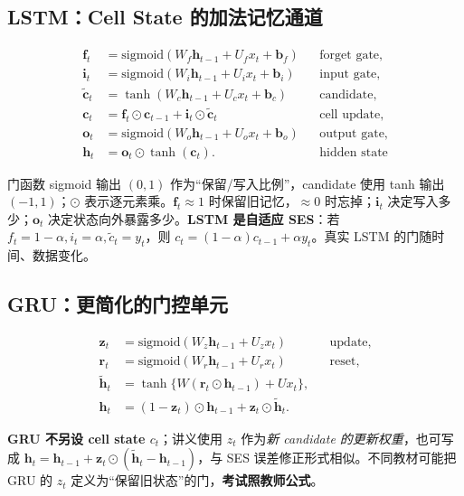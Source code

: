 \documentclass[UTF8,fontset=fandol,10.5pt,a4paper]{ctexart}
\begin{document}
\subsection{LSTM：Cell State 的加法记忆通道}
\begin{keybox}
\begin{align*}
\mathbf f_t&=\mathrm{sigmoid}(W_f\mathbf h_{t-1}+U_fx_t+\mathbf b_f) &&\text{forget gate},\\
\mathbf i_t&=\mathrm{sigmoid}(W_i\mathbf h_{t-1}+U_ix_t+\mathbf b_i) &&\text{input gate},\\
\tilde{\mathbf c}_t&=\tanh(W_c\mathbf h_{t-1}+U_cx_t+\mathbf b_c) &&\text{candidate},\\
\mathbf c_t&=\mathbf f_t\odot\mathbf c_{t-1}+\mathbf i_t\odot\tilde{\mathbf c}_t &&\text{cell update},\\
\mathbf o_t&=\mathrm{sigmoid}(W_o\mathbf h_{t-1}+U_ox_t+\mathbf b_o) &&\text{output gate},\\
\mathbf h_t&=\mathbf o_t\odot\tanh(\mathbf c_t). &&\text{hidden state}
\end{align*}
\end{keybox}
\par\smallskip{}\par\smallskip
门函数 sigmoid 输出 $(0,1)$ 作为“保留/写入比例”，candidate 使用 tanh 输出 $(-1,1)$；$\odot$ 表示逐元素乘。$\mathbf f_t\approx1$ 时保留旧记忆，$\approx0$ 时忘掉；$\mathbf i_t$ 决定写入多少；$\mathbf o_t$ 决定状态向外暴露多少。\textbf{LSTM 是自适应 SES}：若 $f_t=1-\alpha,i_t=\alpha,\tilde c_t=y_t$，则 $c_t=(1-\alpha)c_{t-1}+\alpha y_t$。真实 LSTM 的门随时间、数据变化。
\subsection{GRU：更简化的门控单元}
\begin{keybox}
\begin{align*}
\mathbf z_t&=\mathrm{sigmoid}(W_z\mathbf h_{t-1}+U_zx_t) &&\text{update},\\
\mathbf r_t&=\mathrm{sigmoid}(W_r\mathbf h_{t-1}+U_rx_t) &&\text{reset},\\
\tilde{\mathbf h}_t&=\tanh\{W(\mathbf r_t\odot\mathbf h_{t-1})+Ux_t\},\\
\mathbf h_t&=(1-\mathbf z_t)\odot\mathbf h_{t-1}+\mathbf z_t\odot\tilde{\mathbf h}_t.
\end{align*}
\end{keybox}
\textbf{GRU 不另设 cell state $c_t$}；讲义使用 $z_t$ 作为\emph{新 candidate 的更新权重}，也可写成 $\mathbf h_t=\mathbf h_{t-1}+\mathbf z_t\odot(\tilde{\mathbf h}_t-\mathbf h_{t-1})$，与 SES 误差修正形式相似。不同教材可能把 GRU 的 $z_t$ 定义为“保留旧状态”的门，\textbf{考试照教师公式}。
\end{document}
